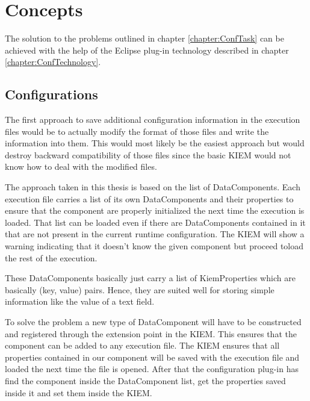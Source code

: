 \chapter{Concepts}
\label{chapter:ConfConcepts}
The solution to the problems outlined in chapter \ref{chapter:ConfTask} can be achieved with
the help of the Eclipse plug-in technology described in chapter \ref{chapter:ConfTechnology}.

\section{Configurations}
\label{section:ConfConceptsConf}
The first approach to save additional configuration information in the execution files would
be to actually modify the format of those files and write the information into them.
This would most likely be the easiest approach but would destroy backward compatibility of
those files since the basic \ac{KIEM} would not know how to deal with the modified files.

The approach taken in this thesis is based on the list of DataComponents. Each execution file 
carries a list of its own DataComponents and their properties to ensure
that the component are properly initialized the next time the execution is loaded. That list
can be loaded even if there are DataComponents contained in it that are not present in the current
runtime configuration. The \ac{KIEM} will show a warning indicating that it doesn't know the given
component but proceed toload the rest of the execution. 

These DataComponents basically just carry a list of KiemProperties which are
basically (key, value) pairs. Hence, they are suited well for storing simple information like the value
of a text field.

To solve the problem a new type of DataComponent will have to be constructed and registered through
the extension point in the \ac{KIEM}. This ensures that the component can be added to any execution
file. The \ac{KIEM} ensures that all properties contained in our component will be saved with
the execution file and loaded the next time the file is opened. After that the configuration plug-in has 
find the component inside the DataComponent list, get the properties saved inside it
and set them inside the \ac{KIEM}.


